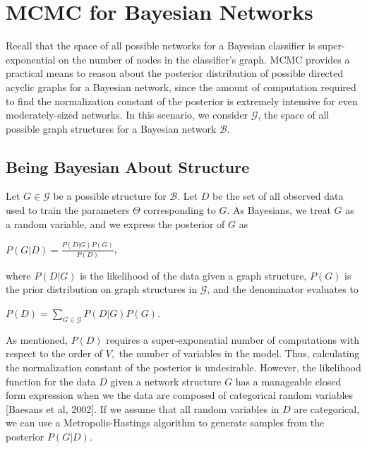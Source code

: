 \documentclass[12pt,twoside]{reedthesis}
\begin{document}
	\section{MCMC for Bayesian Networks}
	Recall that the space of all possible networks for a Bayesian classifier is super-exponential on the number of nodes in the classifier's graph. 
	MCMC provides a practical means to reason about the posterior distribution of possible directed acyclic graphs for a Bayesian network, since the amount of computation required to find the normalization constant of the posterior is extremely intensive for even moderately-sized networks. 
	In this scenario, we consider $\mathcal G$, the space of all possible graph structures for a Bayesian network $\mathcal B$.
		\subsection*{Being Bayesian About Structure}
			Let $G \in \mathcal G$ be a possible structure for $\mathcal B$. 
			Let $D$ be the set of all observed data used to train the parameters $\Theta$ corresponding to $G$. 
			As Bayesians, we treat $G$ as a random variable, and we express the posterior of $G$ as
			\begin{center}
				$P(G | D) = \displaystyle \frac{P(D|G)P(G)}{P(D)}$,
			\end{center}
			where $P(D | G)$ is the likelihood of the data given a graph structure,
			$P(G)$ is the prior distribution on graph structures in $\mathcal G$, and
			the denominator evaluates to
			\begin{center}
				$P(D) = \displaystyle \sum_{G \in \mathcal G}P(D | G) P(G)$.
			\end{center}
			As mentioned, $P(D)$ requires a super-exponential number of computations with respect to the order of $V,$ the number of variables in the model.
			Thus, calculating the normalization constant of the posterior is undesirable. 
			However, the likelihood function for the data $D$ given a network structure $G$ has a manageable closed form expression when we the data are composed of categorical random variables [Baesans et al, 2002]. 
			If we assume that all random variables in $D$ are categorical, we can use a Metropolis-Hastings algorithm to generate samples from the posterior $P(G | D)$.
\end{document}
